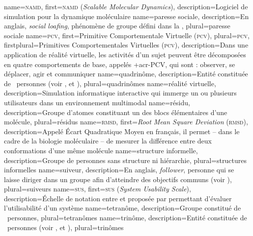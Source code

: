 %
{%
	name={\textsc{namd}},%
	first={\textsc{namd} (\textit{Scalable Molecular Dynamics})},%
	description={Logiciel de simulation pour la dynamique moléculaire }%
}
%
{%
	name={paresse sociale},%
	description={En anglais, \textit{social loafing}, phénomène de groupe défini dans la },
	plural={paresse sociale}%
}
%
{%
	name={\textsc{pcv}},
	first={Primitive Comportementale Virtuelle (\textsc{pcv})},%
	plural={\textsc{pcv}},
	firstplural={Primitives Comportementales Virtuelles (\textsc{pcv})},%
	description={Dans une application de réalité virtuelle, les activités d'un sujet peuvent être décomposées en quatre comportements de base, appelés \myacro+{acr-PCV}, qui sont : observer, se déplacer, agir et communiquer }
}
%
{%
	name={quadrinôme},%
	description={Entité constituée de ~personnes (voir ,  et )},%
	plural={quadrinômes}%
}
%
{%
	name={réalité virtuelle},%
	description={Simulation informatique interactive qui immerge un ou plusieurs utilisateurs dans un environnement multimodal}%
}
%
{%
	name={résidu},%
	description={Groupe d'atomes constituant un des blocs élémentaires d'une molécule},%
	plural={résidus}%
}
%
{%
	name={\textsc{rmsd}},%
	first={\textit{Root Mean Square Deviation} (\textsc{rmsd})},%
	description={Appelé Écart Quadratique Moyen en français, il permet -- dans le cadre de la biologie moléculaire -- de mesurer la différence entre deux conformations d'une même molécule}%
}
%
{%
	name={structure informelle},%
	description={Groupe de personnes sans structure ni hiérarchie},%
	plural={structures informelles}%
}
%
{%
	name={suiveur},%
	description={En anglais, \textit{follower}, personne qui se laisse diriger dans un groupe afin d'atteindre des objectifs communs (voir )},%
	plural={suiveurs}%
}
%
{%
	name={\textsc{sus}},%
	first={\textsc{sus} (\textit{System Usability Scale})},%
	description={Échelle de notation entre  et  proposée par  permettant d'évaluer l'utilisabilité d'un système}%
}
%
{%
	name={tetranôme},%
	description={Groupe constitué de ~personnes},%
	plural={tetranômes}%
}
%
{%
	name={trinôme},%
	description={Entité constituée de ~personnes (voir ,  et )},%
	plural={trinômes}%
}
